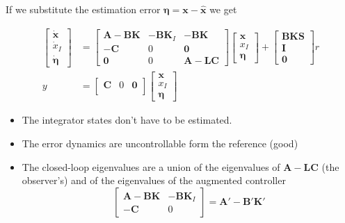 If we substitute the estimation error $\bm{\eta}=\textbf{x}-\hat{\textbf{x}}$ we get

\begin{align*}
    \begin{bmatrix}
        \dot{\mathbf{x}}   \\
        \dot{x}_I \\
        \dot{\bm{\eta}}
    \end{bmatrix}
      & =
    \begin{bmatrix}
        \mathbf{A-BK} & \mathbf{-BK}_I & \mathbf{-BK}  \\
        \mathbf{-C}   & 0              & \mathbf{0}             \\
        \mathbf{0}             & 0              & \mathbf{A-LC}
    \end{bmatrix}
    \begin{bmatrix}
        \mathbf{x}   \\
        x_I \\
        \bm{\eta}
    \end{bmatrix}
    +
    \begin{bmatrix}
        \mathbf{BKS} \\
        \mathbf{I}   \\
        \mathbf{0}
    \end{bmatrix}
    r                           \\
    y & = \begin{bmatrix}
              \mathbf{C} & 0 & \mathbf{0} \\
          \end{bmatrix}
    \begin{bmatrix}
        \mathbf{x}   \\
        x_I \\
        \bm{\eta}
    \end{bmatrix}
\end{align*}

\newpar{}
\begin{itemize}
    \item The integrator states don't have to be estimated.
    \item The error dynamics are uncontrollable form the reference (good)
    \item The closed-loop eigenvalues are a union of the eigenvalues of $\mathbf{A-LC}$ (the observer's) and of the eigenvalues of the augmented controller \begin{equation*}
              \begin{bmatrix}
                  \mathbf{A-BK} & \mathbf{-BK}_I \\
                  \mathbf{-C}   & 0
              \end{bmatrix}
              = \mathbf{A'-B'K'}
          \end{equation*}
\end{itemize}

